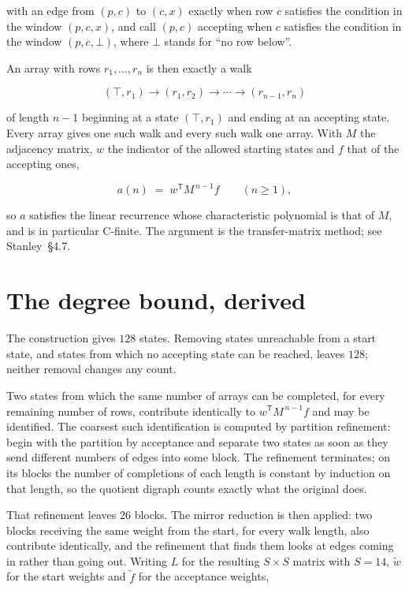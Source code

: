 \documentclass[11pt]{article}
\theoremstyle{definition}
\begin{document}
with an edge from $(p,c)$ to $(c,x)$ exactly when row $c$ satisfies the condition in the window $(p,c,x)$, and call $(p,c)$ accepting when $c$ satisfies the condition in the window $(p,c,\bot)$, where $\bot$ stands for ``no row below''.

An array with rows $r_1,\dots,r_n$ is then exactly a walk

\[(\top,r_1) \to (r_1,r_2) \to \cdots \to (r_{n-1},r_n)\]

of length $n-1$ beginning at a state $(\top,r_1)$ and ending at an accepting state. Every array gives one such walk and every such walk one array. With $M$ the adjacency matrix, $w$ the indicator of the allowed starting states and $f$ that of the accepting ones,

\[a(n) \;=\; w^{\mathsf T} M^{\,n-1} f \qquad (n \ge 1),\]

so $a$ satisfies the linear recurrence whose characteristic polynomial is that of $M$, and is in particular C-finite. The argument is the transfer-matrix method; see Stanley~\S4.7.

\section{The degree bound, derived}

The construction gives $128$ states. Removing states unreachable from a start state, and states from which no accepting state can be reached, leaves $128$; neither removal changes any count.

Two states from which the same number of arrays can be completed, for every remaining number of rows, contribute identically to $w^{\mathsf T}M^{\,n-1}f$ and may be identified. The coarsest such identification is computed by partition refinement: begin with the partition by acceptance and separate two states as soon as they send different numbers of edges into some block. The refinement terminates; on its blocks the number of completions of each length is constant by induction on that length, so the quotient digraph counts exactly what the original does.

That refinement leaves $26$ blocks. The mirror reduction is then applied: two blocks receiving the same weight from the start, for every walk length, also contribute identically, and the refinement that finds them looks at edges coming in rather than going out. Writing $L$ for the resulting $S \times S$ matrix with $S = 14$, $\tilde w$ for the start weights and $\tilde f$ for the acceptance weights,
\end{document}
